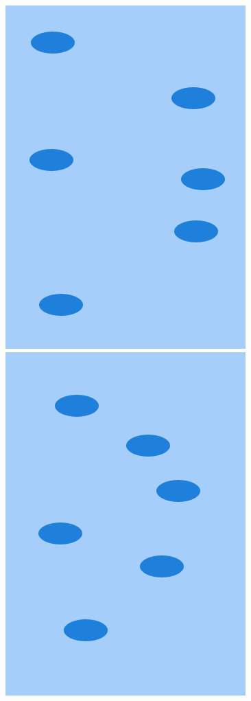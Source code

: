 \documentclass[11pt]{article}
\begin{document}
\begin{figure}[H]
\centerline{%
\includegraphics[scale=0.3]{pics/desktop.png}\hspace{2em}%
\includegraphics[scale=0.3]{pics/desktopresp.png}\hspace{2em}%
}
\end{figure}
\end{document}
